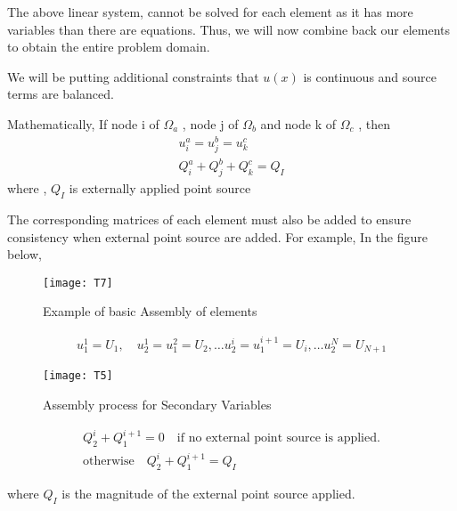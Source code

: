 The above linear system, cannot be solved for each element as it has more variables than there are equations. Thus, we will now combine back our elements to obtain the entire problem domain.

We will be putting additional constraints that $u(x)$ is continuous and source terms are balanced.

Mathematically, If node i of $\Omega_a$ , node j of $\Omega_b$ and  node k of $\Omega_c$ , then 
\begin{eqnarray}
	u_i^a = u_j^b = u_k^c\\
	Q_i^a + Q_j^b + Q_k^c = Q_I
\end{eqnarray}
where , $Q_I$ is externally applied point source

The corresponding matrices of each element must also be added to ensure consistency when external point source are added.
For example,
In the figure below,
    \begin{figure}[h!]
	\centering
	\texttt{[image: T7]}
	\caption{Example of basic Assembly of elements}
\end{figure}
\begin{eqnarray}
	u_1^1 = U_1 , \quad	u_2^1 = u_1^2 =  U_2,  \dots 	u_2^i = u_1^{i+1} =  U_i , \dots u_2^N = U_{N+1}
\end{eqnarray}
    \begin{figure}[h!]
	\centering
	\texttt{[image: T5]}
	\caption{Assembly process for Secondary Variables}
\end{figure}
\begin{eqnarray}
	Q_2^i + Q_1^{i+1} = 0 \quad \text{if no external point source is applied.}\\ \text{otherwise} \quad
	Q_2^i + Q_1^{i+1} = Q_I 
\end{eqnarray}

where $Q_I$ is the magnitude of the external point source applied.

